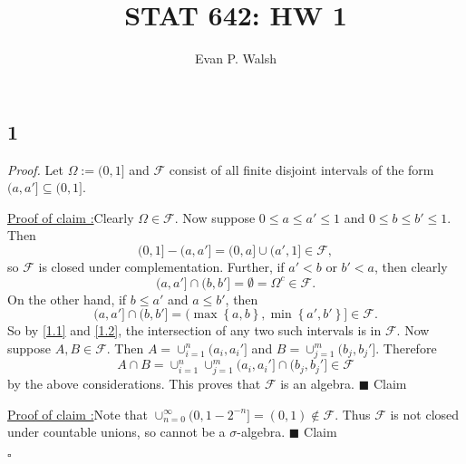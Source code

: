\documentclass[12pt]{article}
\title{STAT 642: HW 1}
\author{Evan P. Walsh}
\newcounter{ProofCounter}
\newcounter{ClaimCounter}[ProofCounter]
\newenvironment{Proof}{\stepcounter{ProofCounter}\textit{Proof.}}{\hfill$\square$}
\newenvironment{claim}[1]{\vspace{1mm}\stepcounter{ClaimCounter}\par\noindent\underline{\bf Claim \theClaimCounter:}\space#1}{}
\newenvironment{claimproof}[1]{\par\noindent\underline{Proof of claim \theClaimCounter:}\space#1}{\hfill $\blacksquare$ Claim \theClaimCounter}
\begin{document}
\maketitle

\subsection*{1}

\begin{Proof} Let $\Omega := (0,1]$ and $\mathcal{F}$ consist of all finite disjoint intervals of the form $(a,a'] \subseteq (0,1]$.

\begin{claimproof}
Clearly $\Omega \in \mathcal{F}$. Now suppose $0 \leq a \leq a' \leq 1$ and $0 \leq b \leq b' \leq 1$. Then 
\[ (0,1] - (a,a'] = (0,a] \cup (a', 1] \in \mathcal{F}, \]
so $\mathcal{F}$ is closed under complementation. Further, if $a' < b$ or $b' < a$, then clearly 
\begin{equation}
(a,a'] \cap (b,b'] = \emptyset = \Omega^{c} \in \mathcal{F}.
\label{1.1}
\end{equation}
On the other hand, if $b \leq a'$ and $a \leq b'$, then 
\begin{equation}
(a,a'] \cap (b,b'] = (\max\left\{ a,b \right\}, \min\left\{ a',b' \right\}] \in \mathcal{F}.
\label{1.2}
\end{equation}
So by \eqref{1.1} and \eqref{1.2}, the intersection of any two such intervals is in $\mathcal{F}$. Now suppose $A, B \in \mathcal{F}$. Then $A =
\cup_{i=1}^{n}(a_{i}, a_{i}']$ and $B = \cup_{j=1}^{m}(b_{j},b_{j}']$. Therefore 
\[ A\cap B = \cup_{i=1}^{n}\cup_{j=1}^{m}(a_{i},a_{i}']\cap (b_{j},b_{j}'] \in \mathcal{F} \]
by the above considerations. This proves that $\mathcal{F}$ is an algebra.
\end{claimproof}

\begin{claimproof}
Note that $\cup_{n=0}^{\infty}(0,1-2^{-n}] = (0,1) \notin \mathcal{F}$. Thus $\mathcal{F}$ is not closed under countable unions, so cannot be a $\sigma$-algebra.
\end{claimproof}

\end{Proof}
\end{document}
